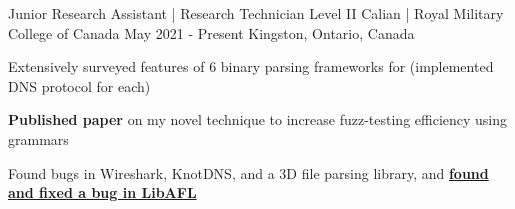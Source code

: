 \begin{cventries}
  \cventry
    {Junior Research Assistant | Research Technician Level II} %
    {Calian | Royal Military College of Canada} %
    {May 2021 - Present} %
    {Kingston, Ontario, Canada} %
    {
      \begin{cvitems} %
        \item{Extensively surveyed features of 6 binary parsing frameworks for (implemented DNS protocol for each)}
        \item{\textbf{Published paper} on my novel technique to increase fuzz-testing efficiency using grammars}
        \item{Found bugs in Wireshark, KnotDNS, and a 3D file parsing library, and \textbf{\href{https://github.com/AFLplusplus/LibAFL/pull/1317}{found and fixed a bug in LibAFL}}}
      \end{cvitems}
    }


\end{cventries}
